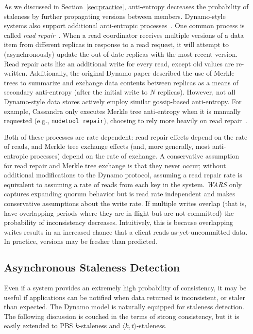 \documentclass{vldb}
\newcommand{\subsectionskip}{-0em}
\begin{document}
As we discussed in Section~\ref{sec:practice}, anti-entropy decreases
the probability of staleness by further propagating versions between
members.  Dynamo-style systems also support additional anti-entropic
processes~\cite{nosql}.  One common process is called \textit{read
  repair}~\cite{dynamo}.  When a read coordinator receives multiple
versions of a data item from different replicas in response to a read
request, it will attempt to (asynchronously) update the out-of-date
replicas with the most recent version.  Read repair acts like an
additional write for every read, except old values are re-written.
Additionally, the original Dynamo paper described the use of Merkle
trees to summarize and exchange data contents between replicas as a
means of secondary anti-entropy (after the initial write to $N$
replicas).  However, not all Dynamo-style data stores actively employ
similar gossip-based anti-entropy.  For example, Cassandra only
executes Merkle tree anti-entropy when it is manually requested (e.g.,
\texttt{nodetool repair}), choosing to rely more heavily on read
repair~\cite{cassandra-merkle}.

Both of these processes are rate dependent: read repair effects depend
on the rate of reads, and Merkle tree exchange effects (and, more
generally, most anti-entropic processes) depend on the rate of
exchange.  A conservative assumption for read repair and Merkle tree
exchange is that they never occur; without additional modifications to
the Dynamo protocol, assuming a read repair rate is equivalent to
assuming a rate of reads from each key in the system.  \textit{WARS}
only captures expanding quorum behavior but is read rate independent
and makes conservative assumptions about the write rate.  If multiple
writes overlap (that is, have overlapping periods where they are
in-flight but are not committed) the probability of inconsistency
decreases.  Intuitively, this is because overlapping writes results in
an increased chance that a client reads as-yet-uncommitted data.  In
practice, versions may be fresher than predicted.

\vspace{\subsectionskip}\subsection{Asynchronous Staleness Detection}

Even if a system provides an extremely high probability of
consistency, it may be useful if applications can be notified when
data returned is inconsistent, or staler than expected.  The Dynamo
model is naturally equipped for staleness detection.  The following
discussion is couched in the terms of strong consistency, but it is
easily extended to PBS $k$-staleness and $\langle k, t
\rangle$-staleness.
\end{document}

